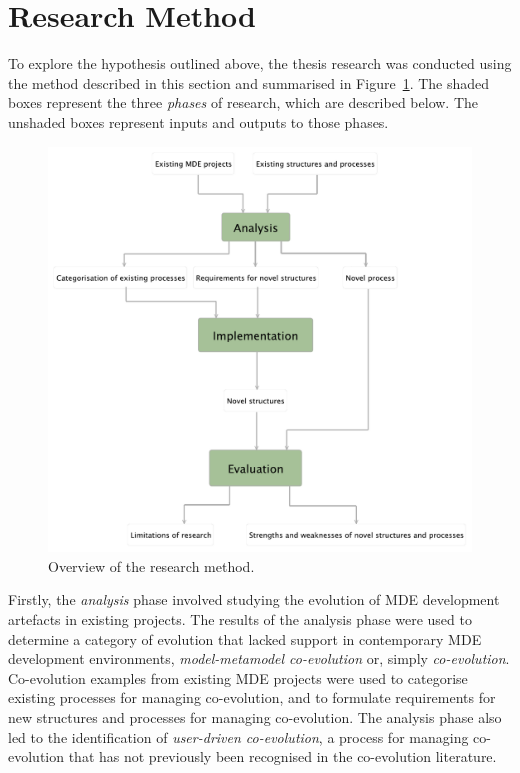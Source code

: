 
\section{Research Method}
\label{sec:research_method}
To explore the hypothesis outlined above, the thesis research was conducted using the method described in this section and summarised in Figure~\ref{fig:research_method}. The shaded boxes represent the three \emph{phases} of research, which are described below. The unshaded boxes represent inputs and outputs to those phases.



\begin{figure}[htbp]
  \begin{center}
    \leavevmode
    \includegraphics[width=12cm]{1.Introduction/images/method.pdf}
  \end{center}
  \caption{Overview of the research method.}
  \label{fig:research_method}
\end{figure}


Firstly, the \emph{analysis} phase involved studying the evolution of MDE development artefacts in existing projects. The results of the analysis phase were used to determine a category of evolution that lacked support in contemporary MDE development environments, \emph{model-metamodel co-evolution} or, simply \emph{co-evolution}. Co-evolution examples from existing MDE projects were used to categorise existing processes for managing co-evolution, and to formulate requirements for new structures and processes for managing co-evolution. The analysis phase also led to the identification of \emph{user-driven co-evolution}, a process for managing co-evolution that has not previously been recognised in the co-evolution literature.

